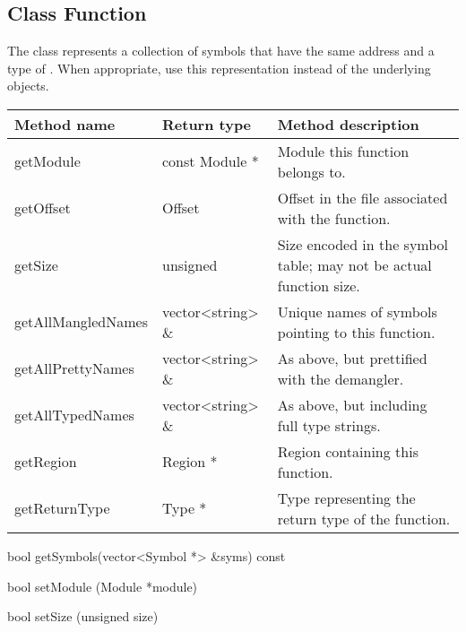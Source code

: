 \subsection{Class Function}\label{Function}
The  class represents a collection of symbols that have the same address
and a type of . When appropriate, use this representation instead of the underlying  objects. 

\begin{tabular}{p{1.25in}p{1.125in}p{3.125in}}
\toprule
Method name & Return type & Method description \\
\midrule
getModule & const Module * & Module this function belongs to. \\
getOffset & Offset & Offset in the file associated with the function. \\
getSize & unsigned & Size encoded in the symbol table; may not be actual function size. \\
getAllMangledNames & vector<string> \& & Unique names of symbols pointing to this function. \\
getAllPrettyNames & vector<string> \& & As above, but prettified with the demangler. \\
getAllTypedNames & vector<string> \& & As above, but including full type strings. \\
getRegion & Region * & Region containing this function. \\
getReturnType & Type * & Type representing the return type of the function. \\
\bottomrule
\end{tabular}
	
\begin{apient}
bool getSymbols(vector<Symbol *> &syms) const
\end{apient}

\begin{apient}
bool setModule (Module *module)
\end{apient}

\begin{apient}
bool setSize (unsigned size)
\end{apient}

